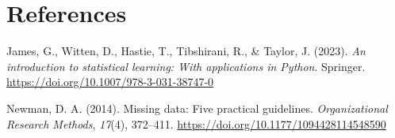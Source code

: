 \documentclass[11pt,a4paper,oneside]{article}
\begin{document}


\tableofcontents
\clearpage


\clearpage


\clearpage
\section*{References}

{\setlength{\parindent}{-1.27cm}\setlength{\leftskip}{1.27cm}\noindent
\hspace*{-1.27cm}James, G., Witten, D., Hastie, T., Tibshirani, R., \& Taylor, J. (2023).
\textit{An introduction to statistical learning: With applications in Python}. Springer.
\url{https://doi.org/10.1007/978-3-031-38747-0}\par\medskip

\noindent\hspace*{-1.27cm}Newman, D. A. (2014). Missing data: Five practical guidelines.
\textit{Organizational Research Methods}, \textit{17}(4), 372--411.
\url{https://doi.org/10.1177/1094428114548590}\par}

\appendix

\end{document}
